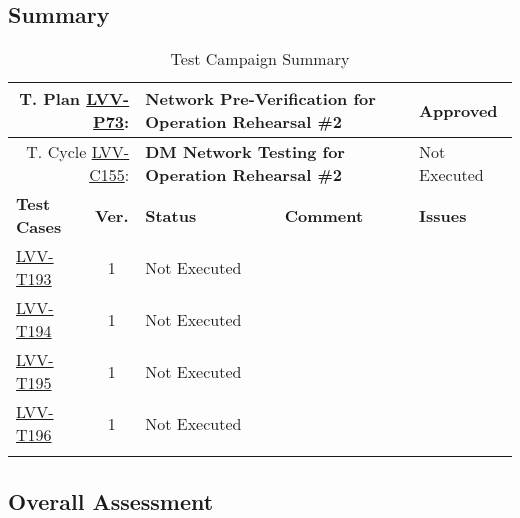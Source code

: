 \documentclass[DM,lsstdraft,STR,toc]{lsstdoc}
\begin{document}
\subsection{Summary}
\label{sect:summarytable}

{\small
\begin{longtable}{p{2cm}cp{2.3cm}p{8.6cm}p{2.3cm}}
\toprule
\multicolumn{2}{r}{ T. Plan \href{https://jira.lsstcorp.org/secure/Tests.jspa\#/testPlan/LVV-P73}{LVV-P73}:} &
\multicolumn{2}{p{10.9cm}}{\textbf{ Network Pre-Verification for Operation Rehearsal \#2 }} & Approved \\\hline
\multicolumn{2}{r}{ T. Cycle \href{https://jira.lsstcorp.org/secure/Tests.jspa\#/testCycle/LVV-C155}{LVV-C155}:} &
\multicolumn{2}{p{10.9cm}}{\textbf{ DM Network Testing for Operation Rehearsal \#2 }} & Not Executed \\\hline
\textbf{Test Cases} &  \textbf{Ver.} & \textbf{Status} & \textbf{Comment} & \textbf{Issues} \\\toprule
\href{https://jira.lsstcorp.org/secure/Tests.jspa#/testCase/LVV-T193}{LVV-T193}
&  1
& Not Executed &
\begin{minipage}[]{9cm}
\smallskip

\medskip
\end{minipage}
&
\\\hline
\href{https://jira.lsstcorp.org/secure/Tests.jspa#/testCase/LVV-T194}{LVV-T194}
&  1
& Not Executed &
\begin{minipage}[]{9cm}
\smallskip

\medskip
\end{minipage}
&
\\\hline
\href{https://jira.lsstcorp.org/secure/Tests.jspa#/testCase/LVV-T195}{LVV-T195}
&  1
& Not Executed &
\begin{minipage}[]{9cm}
\smallskip

\medskip
\end{minipage}
&
\\\hline
\href{https://jira.lsstcorp.org/secure/Tests.jspa#/testCase/LVV-T196}{LVV-T196}
&  1
& Not Executed &
\begin{minipage}[]{9cm}
\smallskip

\medskip
\end{minipage}
&
\\\hline
\caption{Test Campaign Summary}
\label{table:summary}
\end{longtable}
}

\subsection{Overall Assessment}
\label{sect:overallassessment}
\end{document}
